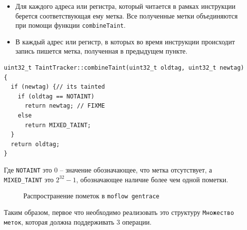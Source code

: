 \begin{itemize}
    \item Для каждого адреса или регистра, который читается в рамках инструкции берется соответствующая ему метка. Все полученные метки объединяются при помощи функции \texttt{combineTaint}.
    \item В каждый адрес или регистр, в которых во время инструкции происходит запись пишется метка, полученная в предыдущем пункте.
\end{itemize}

\begin{lstlisting}[environoment=cpp_code,captionpos=b]
uint32_t TaintTracker::combineTaint(uint32_t oldtag, uint32_t newtag)
{
  if (newtag) {// its tainted
    if (oldtag == NOTAINT)
      return newtag; // FIXME
    else 
      return MIXED_TAINT;
  }
  return oldtag;
}
\end{lstlisting}

Где \texttt{NOTAINT} это $0$ -- значение обозначающее, что метка отсутствует, а \texttt{MIXED\_TAINT} это $2^{32}-1$, обозначающее наличие более чем одной пометки.

\begin{figure}[H]
    \caption{Распространение пометок в \texttt{moflow gentrace}}
    \label{fig:moflow2}
\end{figure}

Таким образом, первое что необходимо реализовать это структуру \texttt{Множество меток}, которая должна поддерживать $3$ операции.

